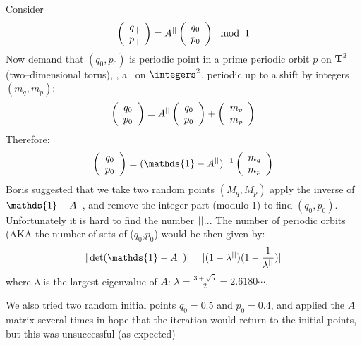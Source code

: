 Consider
\[ \left (
\begin{array}{c}
q_{||} \\
p_{||} \\
\end{array}
\right ) = A^{||} \left (
\begin{array}{c}
q_0 \\
p_0 \\
\end{array}
\right ) \mod\: 1 \]
Now demand that $(q_0,p_0)$ is periodic point in a prime periodic orbit
$p$ on ${\mbox{\bf T}}^{2}$ (two--dimensional torus), \ie, a \rpo\ on
$\integers^2$, periodic up to a shift by integers $(m_q,m_p)$:
\[
\left (
\begin{array}{c}
q_0 \\
p_0 \\
\end{array}
\right ) = A^{||}
\left (
\begin{array}{c}
q_0 \\
p_0 \\
\end{array}
\right ) + \left (
\begin{array}{c}
m_q \\
m_p \\
\end{array}
\right )
\]
Therefore:
\[
\left (
\begin{array}{c}
q_0 \\
p_0 \\
\end{array}
\right ) =
(\mathds{1} - A^\cl{})^{-1}
\left (
\begin{array}{c}
m_q \\
m_p \\
\end{array}
\right )
\]
Boris suggested that we take two random points $(M_q,M_p)$ apply the
inverse of $\mathds{1} - A^\cl{}$, and remove the integer part (modulo 1) to
find $(q_0,p_0)$.
Unfortunately it is hard to find the number ${||}$... The number of
periodic orbits (AKA the number of sets of ($q_0$,$p_0$) would be then
given by:
\[
|\det(\mathds{1} - A^\cl{})| = |(1-\lambda^\cl{})(1-\frac{1}{\lambda^\cl{}})|
\]
where $\lambda$ is the largest eigenvalue of $A$:
$\lambda = \frac{3 + \sqrt{5}}{2} = 2.6180\cdots$.

We also tried two random initial points $q_0 = 0.5$ and $p_0 = 0.4$, and
applied the $A$ matrix several times in hope that the iteration would
return to the initial
points, but this was unsuccessful (as expected)

